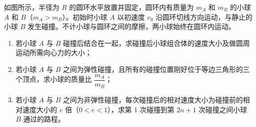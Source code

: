 \begin{question}
如图所示，半径为 $R$ 的圆环水平放置并固定，圆环内有质量为 $m_{A}$ 和 $m_{B}$ 的小球 $A$ 和 $B$（$m_{A}>m_{B}$）。初始时小球 $A$ 以初速度 $v_{0}$ 沿圆环切线方向运动，与静止的小球 $B$ 发生碰撞。不计小球与圆环之间的摩擦，两小球始终在圆环内运动。


\begin{enumerate}[leftmargin=2em, label=(\arabic*)]
  \item 若小球 $A$ 与 $B$ 碰撞后结合在一起，求碰撞后小球组合体的速度大小及做圆周运动所需向心力的大小；
  \item 若小球 $A$ 与 $B$ 之间为弹性碰撞，且所有的碰撞位置刚好位于等边三角形的三个顶点，求小球的质量比 $\dfrac{m_{A}}{m_{B}}$；
  \item 若小球 $A$ 与 $B$ 之间为非弹性碰撞，每次碰撞后的相对速度大小为碰撞前的相对速度大小的 $e$ 倍（$0<e<1$），求第 1 次碰撞到第 $2n+1$ 次碰撞之间小球 $B$ 通过的路程。
\end{enumerate}
\end{question}
